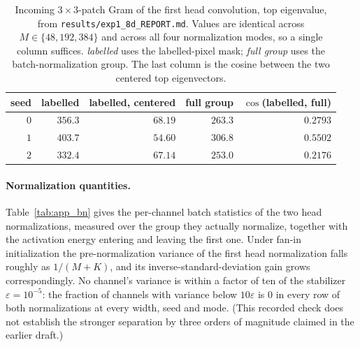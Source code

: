 \begin{table}[htbp]
\centering
\small
\caption{Incoming $3\times3$-patch Gram of the first head convolution, top
eigenvalue, from \texttt{results/exp1\_8d\_REPORT.md}. Values are identical
across $M \in \{48, 192, 384\}$ and across all four normalization modes, so a
single column suffices. \emph{labelled} uses the labelled-pixel mask;
\emph{full group} uses the batch-normalization group. The last column is the
cosine between the two centered top eigenvectors.}
\label{tab:app_gram}
\begin{tabular}{rrrrr}
\toprule
seed & labelled & labelled, centered & full group & $\cos$(labelled, full) \\
\midrule
$0$ & $356.3$ & $68.19$ & $263.3$ & $0.2793$ \\
$1$ & $403.7$ & $54.60$ & $306.8$ & $0.5502$ \\
$2$ & $332.4$ & $67.14$ & $253.0$ & $0.2176$ \\
\bottomrule
\end{tabular}
\end{table}

\paragraph{Normalization quantities.} Table~\ref{tab:app_bn} gives the
per-channel batch statistics of the two head normalizations, measured over the
group they actually normalize, together with the activation energy entering and
leaving the first one. Under fan-in initialization the pre-normalization
variance of the first head normalization falls roughly as $1/(M+K)$, and its
inverse-standard-deviation gain grows correspondingly. No channel's variance is
within a factor of ten of the stabilizer $\varepsilon = 10^{-5}$: the
fraction of channels with variance below $10\varepsilon$ is $0$ in every row
of both normalizations at every width, seed and mode. (This recorded check
does not establish the stronger separation by three orders of magnitude
claimed in the earlier draft.)

